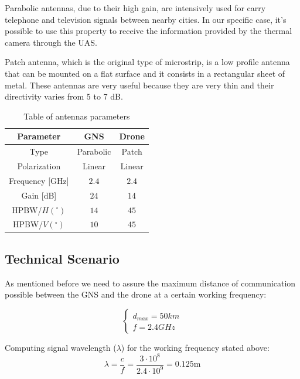 Parabolic antennas, due to their high gain, are intensively used for carry telephone and television signals between nearby cities. In our specific case, it’s possible to use this property to receive the information provided by the thermal camera through the UAS.

Patch antenna, which is the original type of microstrip, is a low profile antenna that can be mounted on a flat surface and it consists in a rectangular sheet of metal. These antennas are very useful because they are very thin and their directivity varies from 5 to 7 dB.

\begin{table}[h!]
\centering
	\begin{tabular}{|c||c|c|}
		\hline
		Parameter & GNS & Drone\\ \hline\hline
		Type & Parabolic & Patch\\ \hline
		Polarization & Linear & Linear\\ \hline
		Frequency [GHz] & $2.4$ & $2.4$\\ \hline
		Gain [dB] & $24$ & $14$\\ \hline
		HPBW/$H(^{\circ})$ & $14$ & $45$\\ \hline
		HPBW/$V(^{\circ})$ & $10$ & $45$\\ \hline
	\end{tabular}
	\caption{Table of antennas parameters}
	\label{table:1}
\end{table}

\subsection{Technical Scenario}
As mentioned before we need to assure the maximum distance of communication possible between the GNS and the drone at a certain working frequency:

\begin{equation*}\label{eq:tech_parameters1} 
 	\begin{cases}
 		d_{max} = 50 km	\\
 		f = 2.4 GHz
 	\end{cases}
\end{equation*}

Computing signal wavelength ($\lambda$) for the working frequency stated above:
\begin{equation*}\label{eq:tech_parameters2}
	\lambda = \frac{c}{f} = \frac{3\cdot 10^{8}}{2.4\cdot 10^{9}} 
	        = 0.125 \text{m}
\end{equation*}

